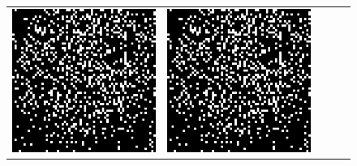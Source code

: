 \begin{figure}
\begin{tabular}{c c c c c}
		\includegraphics[width=\tilewidth,interpolate=false]{media/chp2/associative_memory/hopfield/06_01_noise_scaled_crushed.png}&%
		\includegraphics[width=\tilewidth,interpolate=false]{media/chp2/associative_memory/hopfield/06_02_activation_scaled_crushed.png}&%

\end{tabular}
\end{figure}
